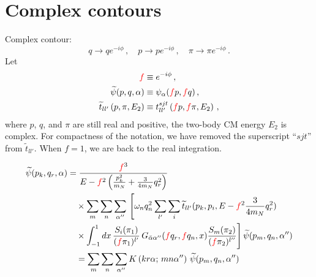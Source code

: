 \documentclass[11pt,aps]{revtex4}
\newcommand{\PF}{{\color{red}f}}
\begin{document}

\section{Complex contours}
Complex contour:
\begin{equation}
  q \to q e^{-i\phi}\, , \quad p \to p e^{-i\phi}\, , \quad \pi \to \pi e^{-i\phi}\, .
\end{equation}
Let
\begin{equation}
  \begin{split}
    \PF &\equiv e^{-i\phi}\, , \\
    \widetilde{\psi}(p, q, \alpha) & \equiv \psi_\alpha(\PF p, \PF q) \, , \\
    \widetilde{t}_{ll'}\left(p, \pi, E_2\right) & \equiv t_{ll'}^{sjt}\left(\PF p, \PF \pi, E_2\right) \, ,
  \end{split}
\end{equation}
where $p$, $q$, and $\pi$ are still real and positive, the two-body CM energy $E_2$ is complex. For compactness of the notation, we have removed the superscript ``$sjt$'' from $\widetilde{t}_{ll'}$. When $f = 1$, we are back to the real integration.

\begin{equation}
\begin{split}
  \widetilde{\psi}(p_{k}, q_r, \alpha) &= \frac{\PF^3}{E - \PF^2 \left(\frac{p_{k}^2}{m_N} + \frac{3}{4m_N}q_r^2 \right)} \\
  & \quad \times \sum_m \sum_{n} \sum_{\alpha''} \, \Bigg{[} \omega_{n} q_n^2 \sum_{l'} \sum_i  \widetilde{t}_{ll'}(p_k, p_i, E - \PF^2 \frac{3}{4m_N}q_r^2)  \\
  & \quad \times \int_{-1}^1{dx}\,  \frac{S_i(\pi_1)}{(\PF\pi_1)^{l'}}\, G_{\bar{\alpha}\alpha''}(\PF q_r, \PF q_n, x)  \frac{S_m(\pi_2)}{(\PF\pi_2)^{l''}} \Bigg{]} \, \widetilde{\psi}(p_m, q_n, \alpha'') \\
  & \quad = \sum_m \sum_{n} \sum_{\alpha''} K\left(kr\alpha;\, mn\alpha''\right) \, \widetilde{\psi}(p_m, q_n, \alpha'')
\end{split}
\end{equation}
\end{document}
